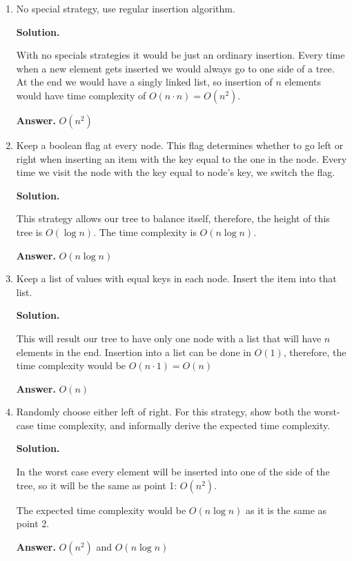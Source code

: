 \documentclass{article}
\begin{document}
\begin{enumerate}
    \item No special strategy, use regular insertion algorithm.
    
    \textbf{Solution.}

    With no specials strategies it would be just an ordinary insertion. Every time when a new element gets inserted we would always go to one side of a tree. At the end we would have a singly linked list, so insertion of $n$ elements would have time complexity of $O(n \cdot n) = O(n^2)$.
    
    \textbf{Answer.} $O(n^2)$
    
    \item Keep a boolean flag at every node. This flag determines whether to go left or right when inserting an item with the key equal to the one in the node. Every time we visit the node with the key equal to node’s key, we switch the flag.

    \textbf{Solution.}

    This strategy allows our tree to balance itself, therefore, the height of this tree is $O(\log{n})$. The time complexity is $O(n\log{n})$.

    \textbf{Answer.} $O(n\log{n})$
    
    \item Keep a list of values with equal keys in each node. Insert the item into that list.

    \textbf{Solution.}
    
    This will result our tree to have only one node with a list that will have $n$ elements in the end. Insertion into a list can be done in $O(1)$, therefore, the time complexity would be $O(n \cdot 1) = O(n)$

    \textbf{Answer.} $O(n)$
    
    \item Randomly choose either left of right. For this strategy, show both the worst-case time complexity, and informally derive the expected time complexity.

    \textbf{Solution.}

    In the worst case every element will be inserted into one of the side of the tree, so it will be the same as point 1: $O(n^2)$.

    The expected time complexity would be $O(n\log{n})$ as it is the same as point 2.

    \textbf{Answer.} $O(n^2)$ and $O(n\log{n})$
    
\end{enumerate}
\end{document}
